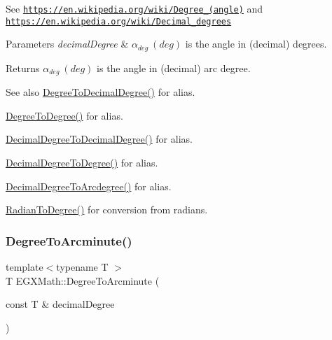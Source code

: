 See \href{https://en.wikipedia.org/wiki/Degree_(angle)}{\tt https\+://en.\+wikipedia.\+org/wiki/\+Degree\+\_\+(angle)} and \href{https://en.wikipedia.org/wiki/Decimal_degrees}{\tt https\+://en.\+wikipedia.\+org/wiki/\+Decimal\+\_\+degrees} 
\begin{DoxyParams}{Parameters}
{\em decimal\+Degree} & $\alpha_{deg}\ (deg)$ is the angle in (decimal) degrees. \\
\hline
\end{DoxyParams}
\begin{DoxyReturn}{Returns}
$\alpha_{deg}\ (deg)$ is the angle in (decimal) arc degree. 
\end{DoxyReturn}
\begin{DoxySeeAlso}{See also}
\mbox{\hyperlink{group___e_g_x_math-_angle_conversions-_degree_ga568afc1d436d425bf5d4edea584aee08}{Degree\+To\+Decimal\+Degree()}} for alias. 

\mbox{\hyperlink{group___e_g_x_math-_angle_conversions-_degree_gaca157e7d3e99a46a11a04b92680d2574}{Degree\+To\+Degree()}} for alias. 

\mbox{\hyperlink{group___e_g_x_math-_angle_conversions-_decimal_degree_gafccf9cd779903872887978ab9d79661f}{Decimal\+Degree\+To\+Decimal\+Degree()}} for alias. 

\mbox{\hyperlink{group___e_g_x_math-_angle_conversions-_decimal_degree_ga0aa7f2f5dbb00cf4ab303421c6e33ccf}{Decimal\+Degree\+To\+Degree()}} for alias. 

\mbox{\hyperlink{group___e_g_x_math-_angle_conversions-_decimal_degree_gacdd463fcabffeb598ebda65b012ce743}{Decimal\+Degree\+To\+Arcdegree()}} for alias. 

\mbox{\hyperlink{group___e_g_x_math-_angle_conversions-_radian_ga25bbce6cdc1c3621f2a158d320e3bc45}{Radian\+To\+Degree()}} for conversion from radians. 
\end{DoxySeeAlso}
\mbox{\label{group___e_g_x_math-_angle_conversions-_degree_ga8abf327dc5f52907b2c881999e9cc43e}} 
\subsubsection{\texorpdfstring{Degree\+To\+Arcminute()}{DegreeToArcminute()}}
{\footnotesize\ttfamily template$<$typename T $>$ \\
T E\+G\+X\+Math\+::\+Degree\+To\+Arcminute (\begin{DoxyParamCaption}\item[{const T \&}]{decimal\+Degree }\end{DoxyParamCaption})}



